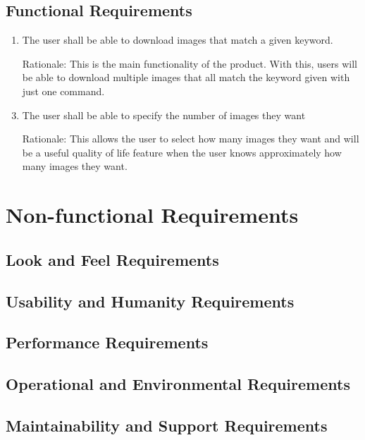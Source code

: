 \documentclass[12pt, titlepage]{article}
\begin{document}
\subsection{Functional Requirements}

\begin{enumerate}[label=FR \arabic*:, wide=0pt, leftmargin=*]
    \item The user shall be able to download images that match a given keyword.
    \item[Rationale:] This is the main functionality of the product. With this, users will be able to download multiple images that all match the keyword given with just one command.
    \\
    \item The user shall be able to specify the number of images they want
    \item[Rationale:] This allows the user to select how many images they want and will be a useful quality of life feature when the user knows approximately how many images they want.
\end{enumerate}

\section{Non-functional Requirements}

\subsection{Look and Feel Requirements}

\subsection{Usability and Humanity Requirements}

\subsection{Performance Requirements}

\subsection{Operational and Environmental Requirements}

\subsection{Maintainability and Support Requirements}
\end{document}
